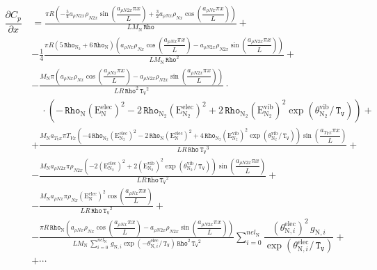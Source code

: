 \documentclass[10pt]{article}
\newcommand{\diff}[2] {\dfrac{\partial #1 }{\partial #2}}
\newcommand{\Rho}{\,\mathtt{Rho}}
\newcommand{\TV}{\,\mathtt{T_V}}
\newcommand{\N}{\text{N}}
\newcommand{\elec}{\text{elec}}
\newcommand{\vib}{\text{vib}}
\newcommand{\E}{\text{E}}
\newcommand{\DCpDx}{\diff{C_p}{x}\,}
\newcommand{\eelecNden}{\,\sum_{i=0}^{nel_{\N}}   \, g_{\N,i}   \exp \left( -\theta^{\elec}_{\N,i} / \TV  \right) }
\begin{document}
\begin{equation}
\begin{split} \label{eq:DCpDx}
 \DCpDx &= 
\frac{\pi R \left(- \frac{5}{4} a_{\rho N2 x} \rho_{N2 x} \sin\left(\dfrac{a_{\rho N2 x} \pi x}{L}\right) + \frac{3}{2} a_{\rho N
x} \rho_{N x} \cos\left(\dfrac{a_{\rho N x} \pi x}{L}\right)\right)}{L M_{\N} \Rho} +\\
%
&- \frac{1}{4}\frac{\pi R \left(5 \Rho_{\N_2} + 6 \Rho_{\N}\right) \left( a_{\rho N x} \rho_{N x} \cos\left(\dfrac{a_{\rho N x}
\pi x}{L}\right) -  a_{\rho N2 x} \rho_{N2 x} \sin\left(\dfrac{a_{\rho N2 x} \pi x}{L}\right) \right)}{L M_{\N} \Rho^{2}} +\\
%
&- \frac{M_{\N} \pi \left(a_{\rho N x} \rho_{N x} \cos\left(\dfrac{a_{\rho N x} \pi x}{L}\right) - a_{\rho N2 x} \rho_{N2 x}
\sin\left(\dfrac{a_{\rho N2 x} \pi x}{L}\right)\right) }{L R \Rho^{2} \TV^{2}}\cdot\\
 &\quad \cdot\left(- \Rho_{\N} \left( \E^{\elec}_{\N} \right)^2 - 2 \Rho_{\N_2} \left( \E^{\elec}_{\N_2} \right)^2 + 2 \Rho_{\N_2}
\left( \E^{\vib}_{\N_2} \right)^2 \exp\left( \theta^{\vib}_{\N_2} / \TV \right) \right) +\\
%
&+ \frac{M_{\N} a_{T_V x} \pi T_{Vx} \left(- 4 \Rho_{\N_2} \left( \E^{\elec}_{\N_2} \right)^2 - 2 \Rho_{\N} \left( \E^{\elec}_{\N}
\right)^2 + 4 \Rho_{\N_2} \left( \E^{\vib}_{\N_2} \right)^2 \exp\left( \theta^{\vib}_{\N_2} / \TV \right) \right)
\sin\left(\dfrac{a_{T_V x} \pi x}{L}\right)}{L R \Rho \TV^{3}} +\\
%
&- \frac{M_{\N} a_{\rho N2 x} \pi \rho_{N2 x} \left(- 2 \left( \E^{\elec}_{\N_2} \right)^2 + 2 \left( \E^{\vib}_{\N_2} \right)^2
\exp\left( \theta^{\vib}_{\N_2} / \TV \right) \right) \sin\left(\dfrac{a_{\rho N2 x} \pi x}{L}\right)}{L R \Rho \TV^{2}} +\\
%
&- \frac{M_{\N} a_{\rho N x} \pi \rho_{N x} \left( \E^{\elec}_{\N} \right)^2 \cos\left(\dfrac{a_{\rho N x} \pi x}{L}\right)}{L R
\Rho \TV^{2}} +\\
%
&- \frac{\pi R \Rho_{\N} \left(a_{\rho N x} \rho_{N x} \cos\left(\dfrac{a_{\rho N x} \pi x}{L}\right) - a_{\rho N2 x} \rho_{N2 x}
\sin\left(\dfrac{a_{\rho N2 x} \pi x}{L}\right)\right)}{L M_{\N} \eelecNden \Rho^{2} \TV^{2}} \sum_{i=0}^{nel_{\N}} \dfrac{ \left(
\theta^{\elec}_{\N,i} \right)^2   \, g_{\N,i} }{ \exp \left( \theta^{\elec}_{\N,i} / \TV \right)}+\\
%
%
&+\cdots \\
\end{split}
\end{equation}
\end{document}
